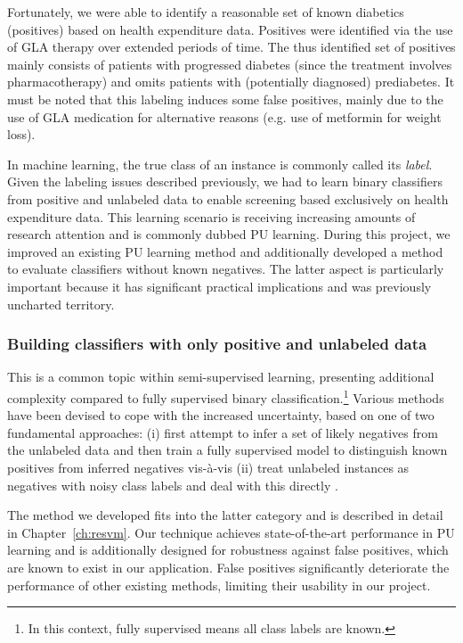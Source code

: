 Fortunately, we were able to identify a reasonable set of known diabetics (positives) based on health expenditure data. Positives were identified via the use of GLA therapy over extended periods of time. The thus identified set of positives mainly consists of patients with progressed diabetes (since the treatment involves pharmacotherapy) and omits patients with (potentially diagnosed) prediabetes. It must be noted that this labeling induces some false positives, mainly due to the use of GLA medication for alternative reasons (e.g. use of metformin for weight loss).

In machine learning, the true class of an instance is commonly called its \emph{label}. Given the labeling issues described previously, we had to learn binary classifiers from positive and unlabeled data to enable screening based exclusively on health expenditure data. This learning scenario is receiving increasing amounts of research attention and is commonly dubbed PU learning. During this project, we improved an existing PU learning method and additionally developed a method to evaluate classifiers without known negatives. The latter aspect is particularly important because it has significant practical implications and was previously uncharted territory.

\subsubsection{Building classifiers with only positive and unlabeled data} 
This is a common topic within semi-supervised learning, presenting additional complexity compared to fully supervised binary classification.\footnote{In this context, fully supervised means all class labels are known.} Various methods have been devised to cope with the increased uncertainty, based on one of two fundamental approaches:
(i) first attempt to infer a set of likely negatives from the unlabeled data and then train a fully supervised model to distinguish known positives from inferred negatives \citep{liu02partially,Yu:2005:SCM:1108759.1108762,Li03learningto} vis-\`a-vis (ii) treat unlabeled instances as negatives with noisy class labels and deal with this directly \citep{Elkan:2008:LCO:1401890.1401920,Lee03learningwith,Liu:2003:BTC:951949.952139,mordelet2014bagging,Liu:2005:PSC:2138033.2138052}.

The method we developed fits into the latter category and is described in detail in Chapter~\ref{ch:resvm}. Our technique achieves state-of-the-art performance in PU learning and is additionally designed for robustness against false positives, which are known to exist in our application. False positives significantly deteriorate the performance of other existing methods, limiting their usability in our project.

